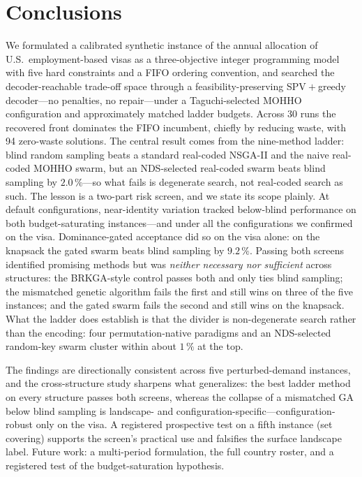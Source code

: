\documentclass[runningheads]{llncs}
\begin{document}
\section{Conclusions}
\label{sec:conclusions}

We formulated a calibrated synthetic instance of the annual allocation of U.S.\ employment-based visas as a three-objective integer programming model with five hard constraints and a FIFO ordering convention, and searched the decoder-reachable trade-off space through a feasibility-preserving SPV${}+{}$greedy decoder---no penalties, no repair---under a Taguchi-selected MOHHO configuration and approximately matched ladder budgets. Across 30 runs the recovered front dominates the FIFO incumbent, chiefly by reducing waste, with 94 zero-waste solutions. The central result comes from the nine-method ladder: blind random sampling beats a standard real-coded NSGA-II and the naive real-coded MOHHO swarm, but an NDS-selected real-coded swarm beats blind sampling by $2.0\,\%$---so what fails is degenerate search, not real-coded search as such. The lesson is a two-part risk screen, and we state its scope plainly. At default configurations, near-identity variation tracked below-blind performance on both budget-saturating instances---and under all the configurations we confirmed on the visa. Dominance-gated acceptance did so on the visa alone: on the knapsack the gated swarm beats blind sampling by $9.2\,\%$. Passing both screens identified promising methods but was \emph{neither necessary nor sufficient} across structures: the BRKGA-style control passes both and only ties blind sampling; the mismatched genetic algorithm fails the first and still wins on three of the five instances; and the gated swarm fails the second and still wins on the knapsack. What the ladder does establish is that the divider is non-degenerate search rather than the encoding: four permutation-native paradigms and an NDS-selected random-key swarm cluster within about $1\,\%$ at the top.

The findings are directionally consistent across five perturbed-demand instances, and the cross-structure study sharpens what generalizes: the best ladder method on every structure passes both screens, whereas the collapse of a mismatched GA below blind sampling is landscape- and configuration-specific---configuration-robust only on the visa. A registered prospective test on a fifth instance (set covering) supports the screen's practical use and falsifies the surface landscape label. Future work: a multi-period formulation, the full country roster, and a registered test of the budget-saturation hypothesis.
\end{document}
